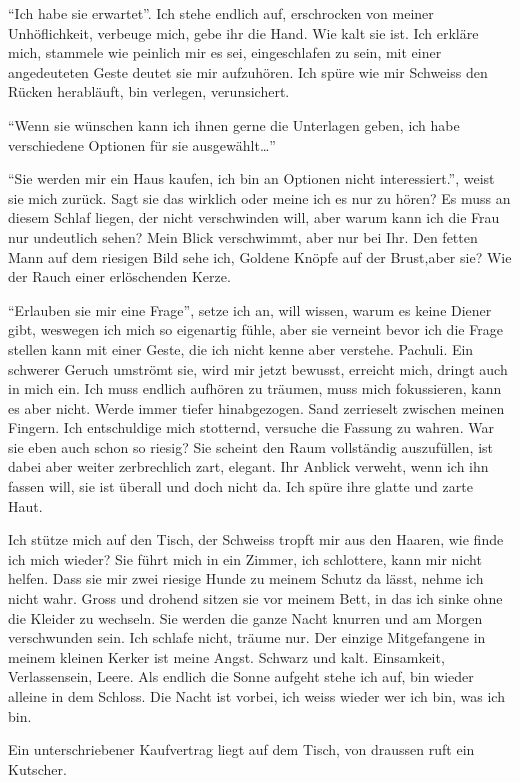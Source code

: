 \enquote{Ich habe sie erwartet}. Ich stehe endlich auf, erschrocken von meiner Unhöflichkeit, verbeuge mich, gebe ihr die Hand. Wie kalt sie ist. Ich erkläre mich, stammele wie peinlich mir es sei, eingeschlafen zu sein, mit einer angedeuteten Geste deutet sie mir aufzuhören. Ich spüre wie mir Schweiss den Rücken herabläuft, bin verlegen, verunsichert.

\enquote{Wenn sie wünschen kann ich ihnen gerne die Unterlagen geben, ich habe verschiedene Optionen für sie ausgewählt\dots} 

\enquote{Sie werden mir ein Haus kaufen, ich bin an Optionen nicht interessiert.}, weist sie mich zurück. Sagt sie das wirklich oder meine ich es nur zu hören? Es muss an diesem Schlaf liegen, der nicht verschwinden will, aber warum kann ich die Frau nur undeutlich sehen? Mein Blick verschwimmt, aber nur bei Ihr. Den fetten Mann auf dem riesigen Bild sehe ich, Goldene Knöpfe auf der Brust,aber sie? Wie der Rauch einer erlöschenden Kerze.

\enquote{Erlauben sie mir eine Frage}, setze ich an, will wissen, warum es keine Diener gibt, weswegen ich mich so eigenartig fühle, aber sie verneint bevor ich die Frage stellen kann mit einer Geste, die ich nicht kenne aber verstehe. Pachuli. Ein schwerer Geruch umströmt sie, wird mir jetzt bewusst, erreicht mich, dringt auch in mich ein. Ich muss endlich aufhören zu träumen, muss mich fokussieren, kann es aber nicht. Werde immer tiefer hinabgezogen. Sand zerrieselt zwischen meinen Fingern. Ich entschuldige mich stotternd, versuche die Fassung zu wahren. War sie eben auch schon so riesig? Sie scheint den Raum vollständig auszufüllen, ist dabei aber weiter zerbrechlich zart, elegant. Ihr Anblick verweht, wenn ich ihn fassen will, sie ist überall und doch nicht da. Ich spüre ihre glatte und zarte Haut.

Ich stütze mich auf den Tisch, der Schweiss tropft mir aus den Haaren, wie finde ich mich wieder? Sie führt mich in ein Zimmer, ich schlottere, kann mir nicht helfen. Dass sie mir zwei riesige Hunde zu meinem Schutz da lässt, nehme ich nicht wahr. Gross und drohend sitzen sie vor meinem Bett, in das ich sinke ohne die Kleider zu wechseln. Sie werden die ganze Nacht knurren und am Morgen verschwunden sein. Ich schlafe nicht, träume nur. Der einzige Mitgefangene in meinem kleinen Kerker ist meine Angst. Schwarz und kalt. Einsamkeit, Verlassensein, Leere. Als endlich die Sonne aufgeht stehe ich auf, bin wieder alleine in dem Schloss. Die Nacht ist vorbei, ich weiss wieder wer ich bin, was ich bin. 

Ein unterschriebener Kaufvertrag liegt auf dem Tisch, von draussen ruft ein Kutscher.\hfill {}
\newpage 
